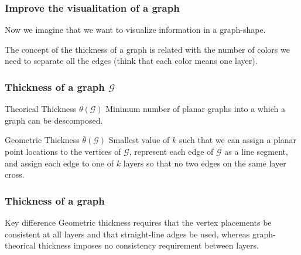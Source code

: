 \documentclass[12 pt]{beamer}
\begin{document}
\begin{frame}{2}
    \frametitle{Improve the visualitation of a graph}
    Now we imagine that we want to visualize information in a graph-shape.
    
    \pause
    \pause
    
    The concept of the thickness of a graph is related with the number of colors we need to separate oll the edges (think that each color means one layer).
    
\end{frame}

\begin{frame}{3}
    \frametitle{Thickness of a graph $\mathcal{G}$}
  
    \begin{block}{Theorical Thickness $\theta (\mathcal{G})$}
    Minimum number of planar graphs into a which a graph can be descomposed.
    \end{block}
    
    \pause
    
    \begin{block}{Geometric Thickness $\bar{\theta} (\mathcal{G})$}
    Smallest value of $k$ such that we can assign a planar point locations to the vertices of $\mathcal{G}$, represent each edge of $\mathcal{G}$ as a line segment, and assign each edge to one of $k$ layers so that no two edges on the same layer cross.
    \end{block}

\end{frame}

\begin{frame}{4}
    \frametitle{Thickness of a graph}
  
    \begin{alertblock}{Key difference}
    Geometric thickness requires that the vertex placements be consistent at all layers and that straight-line adges be used, whereas graph-theorical thickness imposes no consistency requirement between layers.
    \end{alertblock}
\end{frame}
\end{document}
